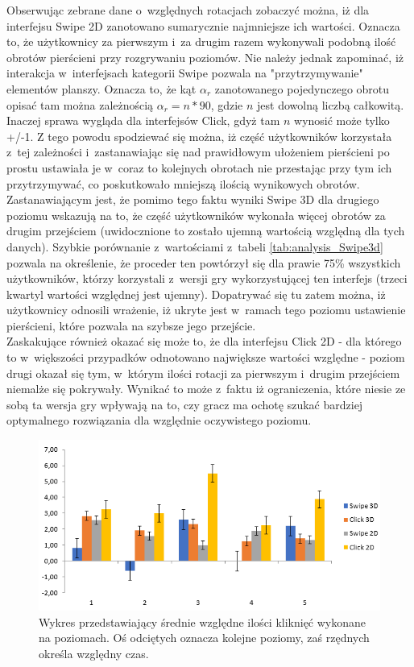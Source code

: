 \documentclass[a4paper,12pt,numbers=noenddot]{report}
\begin{document}
Obserwując zebrane dane o~względnych rotacjach zobaczyć można, iż dla interfejsu Swipe 2D zanotowano sumarycznie najmniejsze ich wartości. Oznacza to, że użytkownicy za pierwszym i~za drugim razem wykonywali podobną ilość obrotów pierścieni przy rozgrywaniu poziomów. Nie należy jednak zapominać, iż interakcja w~interfejsach kategorii Swipe pozwala na "przytrzymywanie" elementów planszy. Oznacza to, że kąt $\alpha_r$ zanotowanego pojedynczego obrotu opisać tam można zależnością $\alpha_r = n * 90$, gdzie $n$ jest dowolną liczbą całkowitą. Inaczej sprawa wygląda dla interfejsów Click, gdyż tam $n$ wynosić może tylko +/-1. Z tego powodu spodziewać się można, iż część użytkowników korzystała z~tej zależności i~zastanawiając się nad prawidłowym ułożeniem pierścieni po prostu ustawiała je w~coraz to kolejnych obrotach nie przestając przy tym ich przytrzymywać, co poskutkowało mniejszą ilością wynikowych obrotów. \\
Zastanawiającym jest, że pomimo tego faktu wyniki Swipe 3D dla drugiego poziomu wskazują na to, że część użytkowników wykonała więcej obrotów za drugim przejściem (uwidocznione to zostało ujemną wartością względną dla tych danych). Szybkie porównanie z~wartościami z~tabeli \ref{tab:analysis_Swipe3d} pozwala na określenie, że proceder ten powtórzył się dla prawie 75\% wszystkich użytkowników, którzy korzystali z~wersji gry wykorzystującej ten interfejs (trzeci kwartyl wartości względnej jest ujemny). Dopatrywać się tu zatem można, iż użytkownicy odnosili wrażenie, iż ukryte jest w~ramach tego poziomu ustawienie pierścieni, które pozwala na szybsze jego przejście. \\
Zaskakujące również okazać się może to, że dla interfejsu Click 2D - dla którego to w~większości przypadków odnotowano największe wartości względne - poziom drugi okazał się tym, w~którym ilości rotacji za pierwszym i~drugim przejściem niemalże się pokrywały. Wynikać to może z~faktu iż ograniczenia, które niesie ze sobą ta wersja gry wpływają na to, czy gracz ma ochotę szukać bardziej optymalnego rozwiązania dla względnie oczywistego poziomu.

\begin{figure}[h!]
	\centering
  	\includegraphics[width=0.9\linewidth]{diag/rel_mean_Clicks.png}
	\caption{Wykres przedstawiający średnie względne ilości kliknięć wykonane na poziomach. Oś odciętych oznacza kolejne poziomy, zaś rzędnych określa względny czas.}
	\label{fig:diag:rel:mean_Clicks}
\end{figure}
\end{document}
